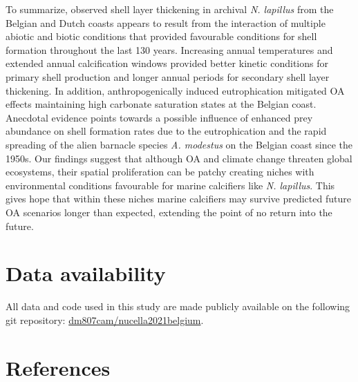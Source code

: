 \documentclass[smallextended]{svjour3}       %
\begin{document}
To summarize, observed shell layer thickening in archival \emph{N.
lapillus} from the Belgian and Dutch coasts appears to result from the
interaction of multiple abiotic and biotic conditions that provided
favourable conditions for shell formation throughout the last 130 years.
Increasing annual temperatures and extended annual calcification windows
provided better kinetic conditions for primary shell production and
longer annual periods for secondary shell layer thickening. In addition,
anthropogenically induced eutrophication mitigated OA effects
maintaining high carbonate saturation states at the Belgian coast.
Anecdotal evidence points towards a possible influence of enhanced prey
abundance on shell formation rates due to the eutrophication and the
rapid spreading of the alien barnacle species \emph{A. modestus} on the
Belgian coast since the 1950s. Our findings suggest that although OA and
climate change threaten global ecosystems, their spatial proliferation
can be patchy creating niches with environmental conditions favourable
for marine calcifiers like \emph{N. lapillus}. This gives hope that
within these niches marine calcifiers may survive predicted future OA
scenarios longer than expected, extending the point of no return into
the future.

\hypertarget{data-availability}{%
\section{Data availability}\label{data-availability}}

All data and code used in this study are made publicly available on the
following git repository:
\href{https://github.com/dm807cam/nucella2021belgium}{dm807cam/nucella2021belgium}.

\hypertarget{references}{%
\section*{References}\label{references}}
\end{document}
